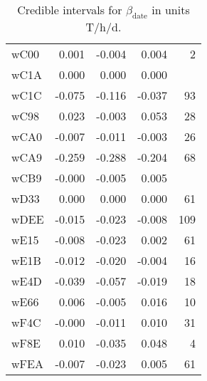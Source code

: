 \begin{table}[ht]
\begin{tabular}{lrrrr}
  wC00 & 0.001 & -0.004 & 0.004 &    2 \\ 
  wC1A & 0.000 & 0.000 & 0.000 &  \\ 
  wC1C & -0.075 & -0.116 & -0.037 &   93 \\ 
  wC98 & 0.023 & -0.003 & 0.053 &   28 \\ 
  wCA0 & -0.007 & -0.011 & -0.003 &   26 \\ 
  wCA9 & -0.259 & -0.288 & -0.204 &   68 \\ 
  wCB9 & -0.000 & -0.005 & 0.005 &  \\ 
  wD33 & 0.000 & 0.000 & 0.000 &   61 \\ 
  wDEE & -0.015 & -0.023 & -0.008 &  109 \\ 
  wE15 & -0.008 & -0.023 & 0.002 &   61 \\ 
  wE1B & -0.012 & -0.020 & -0.004 &   16 \\ 
  wE4D & -0.039 & -0.057 & -0.019 &   18 \\ 
  wE66 & 0.006 & -0.005 & 0.016 &   10 \\ 
  wF4C & -0.000 & -0.011 & 0.010 &   31 \\ 
  wF8E & 0.010 & -0.035 & 0.048 &    4 \\ 
  wFEA & -0.007 & -0.023 & 0.005 &   61 \\ 
   \hline
\end{tabular}
\endgroup
\caption{Credible intervals for $\beta_\text{date}$ in units T/h/d.} 
\label{tab:beta_date_all}
\end{table}
